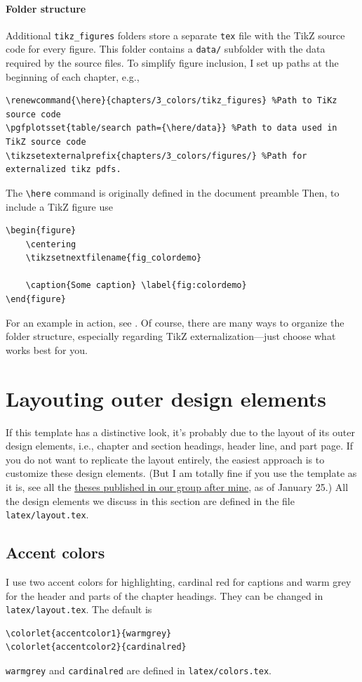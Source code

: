 \paragraph{Folder structure}
Additional \verb|tikz_figures| folders store a separate \verb|tex| file with the TikZ source code for every figure. This folder contains a \verb|data/| subfolder with the data required by the source files. To simplify figure inclusion, I set up paths at the beginning of each chapter, e.g.,
\begin{lstlisting}
\renewcommand{\here}{chapters/3_colors/tikz_figures} %Path to TiKz source code
\pgfplotsset{table/search path={\here/data}} %Path to data used in TikZ source code
\tikzsetexternalprefix{chapters/3_colors/figures/} %Path for externalized tikz pdfs.
\end{lstlisting}
The \verb|\here| command is originally defined in the document preamble
Then, to include a TikZ figure use
\begin{lstlisting}
\begin{figure}
	\centering
	\tikzsetnextfilename{fig_colordemo}
	
	\caption{Some caption} \label{fig:colordemo}
\end{figure}
\end{lstlisting}
For an example in action, see .
Of course, there are many ways to organize the folder structure, especially regarding TikZ externalization---just choose what works best for you.

\section[Layouting ``outer'' design elements]{Layouting outer design elements}

If this template has a distinctive look, it's probably due to the layout of its outer design elements, i.e., chapter and section headings, header line, and part page. If you do not want to replicate the layout entirely, the easiest approach is to customize these design elements. (But I am totally fine if you use the template as it is, see all the \href{https://www.thp.uni-koeln.de/trebst/thesisprojects.shtml}{theses published in our group after mine}, as of January 25.)
All the design elements we discuss in this section are defined in the file \verb|latex/layout.tex|. 


\subsection{Accent colors}
I use two accent colors for highlighting, cardinal red for captions and warm grey for the header and parts of the chapter headings. They can be changed in \verb|latex/layout.tex|. The default is
\begin{lstlisting}
\colorlet{accentcolor1}{warmgrey}
\colorlet{accentcolor2}{cardinalred}
\end{lstlisting}
\verb|warmgrey| and \verb|cardinalred| are defined in \verb|latex/colors.tex|. 

